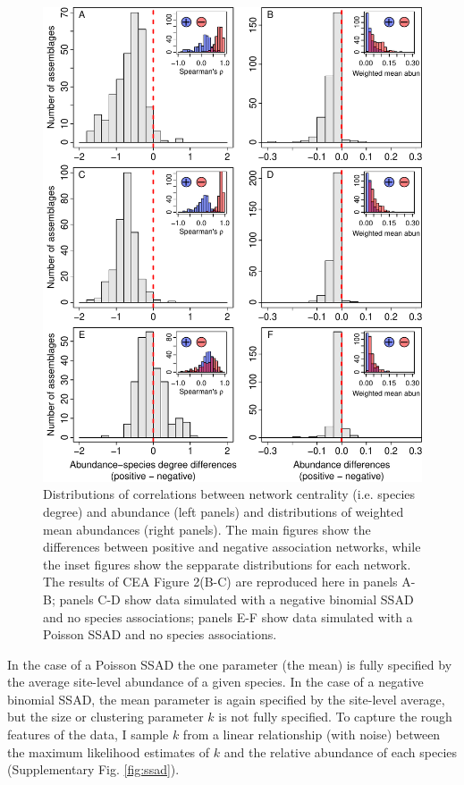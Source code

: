 \documentclass[
]{article}
\begin{document}
\begin{figure}

{\centering \includegraphics{RarePlusComMinus_files/figure-latex/fig_plusMinus-1} 

}

\caption{Distributions of correlations between network centrality (i.e. species degree) and abundance (left panels) and distributions of weighted mean abundances (right panels). The main figures show the differences between positive and negative association networks, while the inset figures show the sepparate distributions for each network. The results of CEA Figure 2(B-C) are reproduced here in panels A-B; panels C-D show data simulated with a negative binomial SSAD and no species associations; panels E-F show data simulated with a Poisson SSAD and no species associations. \label{fig:plusMinus}}\label{fig:fig_plusMinus}
\end{figure}

In the case of a Poisson SSAD the one parameter (the mean) is fully
specified by the average site-level abundance of a given species. In the
case of a negative binomial SSAD, the mean parameter is again specified
by the site-level average, but the size or clustering parameter \(k\) is
not fully specified. To capture the rough features of the data, I sample
\(k\) from a linear relationship (with noise) between the maximum
likelihood estimates of \(k\) and the relative abundance of each species
(Supplementary Fig. \ref{fig:ssad}).
\end{document}
